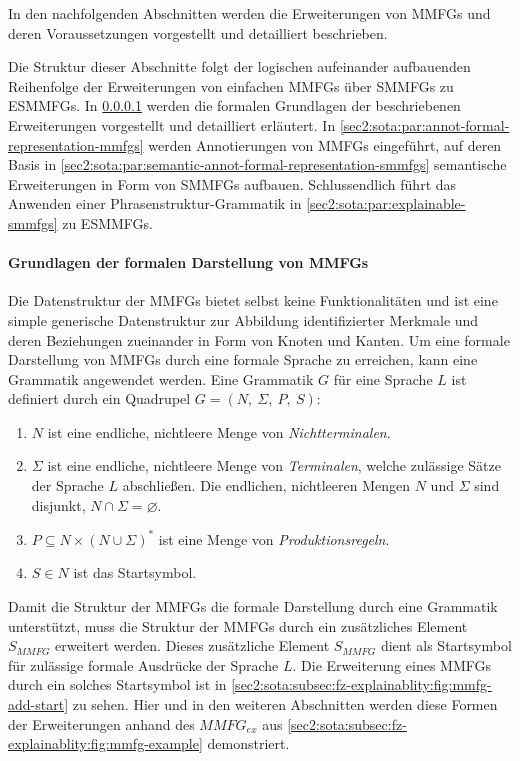 In den nachfolgenden Abschnitten werden die Erweiterungen von MMFGs und deren Voraussetzungen vorgestellt und detailliert beschrieben.

Die Struktur dieser Abschnitte folgt der logischen aufeinander aufbauenden Reihenfolge der Erweiterungen von einfachen MMFGs über SMMFGs zu ESMMFGs.
In \cref{sec2:sota:par:basic-formal-representation-mmfgs} werden die formalen Grundlagen der beschriebenen Erweiterungen vorgestellt und detailliert erläutert.
In \cref{sec2:sota:par:annot-formal-representation-mmfgs} werden Annotierungen von MMFGs eingeführt, auf deren Basis in \cref{sec2:sota:par:semantic-annot-formal-representation-smmfgs} semantische Erweiterungen in Form von SMMFGs aufbauen.
Schlussendlich führt das Anwenden einer Phrasenstruktur-Grammatik in \cref{sec2:sota:par:explainable-smmfgs} zu ESMMFGs.

\paragraph{Grundlagen der formalen Darstellung von MMFGs}
\label{sec2:sota:par:basic-formal-representation-mmfgs}
Die Datenstruktur der MMFGs bietet selbst keine Funktionalitäten und ist eine simple generische Datenstruktur zur Abbildung identifizierter Merkmale und deren Beziehungen zueinander in Form von Knoten und Kanten.
Um eine formale Darstellung von MMFGs durch eine formale Sprache zu erreichen, kann eine Grammatik angewendet werden. 
Eine Grammatik $G$ für eine Sprache $L$ ist definiert durch ein Quadrupel $G = (N,~\Sigma,~P,~S)$:
\begin{enumerate}
    \setlength{\itemsep}{0pt}
    \item $N$ ist eine endliche, nichtleere Menge von \textit{Nichtterminalen}.
    \item $\Sigma$ ist eine endliche, nichtleere Menge von \textit{Terminalen}, welche zulässige Sätze der Sprache $L$ abschließen. Die endlichen, nichtleeren Mengen $N$ und $\Sigma$ sind disjunkt, $N \cap \Sigma = \varnothing$.
    \item $P \subseteq N \times (N \cup \Sigma)^{*}$ ist eine Menge von \textit{Produktionsregeln}.
    \item $S \in N$ ist das Startsymbol.
\end{enumerate}
Damit die Struktur der MMFGs die formale Darstellung durch eine Grammatik unterstützt, muss die Struktur der MMFGs durch ein zusätzliches Element $S_{MMFG}$ erweitert werden.
Dieses zusätzliche Element $S_{MMFG}$ dient als Startsymbol für zulässige formale Ausdrücke der Sprache $L$.
Die Erweiterung eines MMFGs durch ein solches Startsymbol ist in \cref{sec2:sota:subsec:fz-explainablity:fig:mmfg-add-start} zu sehen. 
Hier und in den weiteren Abschnitten werden diese Formen der Erweiterungen anhand des $MMFG_{ex}$ aus \cref{sec2:sota:subsec:fz-explainablity:fig:mmfg-example} demonstriert.

